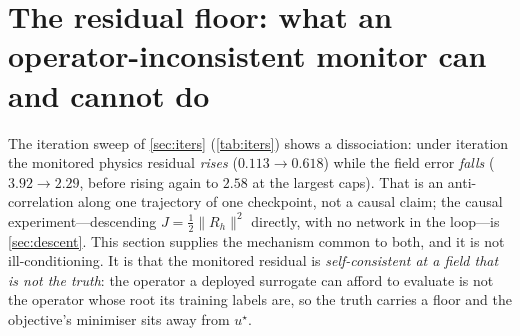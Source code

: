 %

\section{The residual floor: what an operator-inconsistent monitor can and cannot do}
\label{sec:residual_floor}

The iteration sweep of \autoref{sec:iters} (\autoref{tab:iters}) shows a dissociation:
under iteration the monitored physics residual \emph{rises} ($0.113\to0.618$) while the
field error \emph{falls} ($3.92\to2.29$, before rising again to $2.58$ at the largest
caps). That is an anti-correlation along one trajectory of one checkpoint, not a causal
claim; the causal experiment---descending $J=\tfrac12\|R_h\|^2$ directly, with no network
in the loop---is \autoref{sec:descent}. This section supplies the mechanism common to
both, and it is not ill-conditioning. It is that the monitored residual is
\emph{self-consistent at a field that is not the truth}: the operator a deployed surrogate
can afford to evaluate is not the operator whose root its training labels are, so the
truth carries a floor and the objective's minimiser sits away from $u^\star$.

